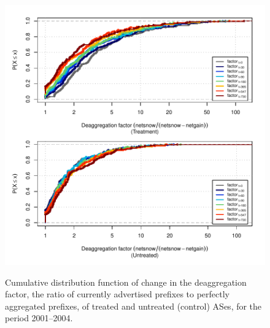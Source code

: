 \begin{figure}[H]
\begin{centering}
\begin{singlespace}
    \includegraphics[width=6in]
    {figures/behavior-deagg_factor-2001_2004-corr.pdf}
    \vspace{-2em}\\
    \caption{Cumulative distribution function of change in the deaggregation
    factor, the ratio of currently advertised prefixes to perfectly aggregated
    prefixes, of treated and untreated (control) ASes, for the period
    2001--2004.}
\end{singlespace}
\end{centering}
\end{figure}
